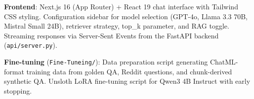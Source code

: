 \documentclass{article}
\begin{document}
\textbf{Frontend}: Next.js 16 (App Router) + React 19 chat interface with Tailwind CSS styling. Configuration sidebar for model selection (GPT-4o, Llama 3.3 70B, Mistral Small 24B), retriever strategy, top\_k parameter, and RAG toggle. Streaming responses via Server-Sent Events from the FastAPI backend (\texttt{api/server.py}).

\textbf{Fine-tuning} (\texttt{Fine-Tuneing/}): Data preparation script generating ChatML-format training data from golden QA, Reddit questions, and chunk-derived synthetic QA. Unsloth LoRA fine-tuning script for Qwen3 4B Instruct with early stopping.


\newpage

\end{document}
